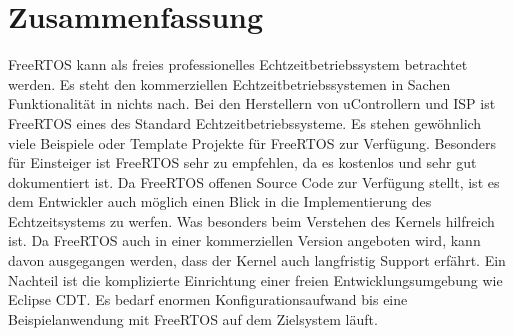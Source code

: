 \pagebreak
\section{Zusammenfassung}
FreeRTOS kann als freies professionelles Echtzeitbetriebssystem betrachtet werden. Es steht den kommerziellen Echtzeitbetriebssystemen in Sachen Funktionalität in nichts nach. Bei den Herstellern von uControllern und ISP ist FreeRTOS eines des Standard Echtzeitbetriebssysteme. Es stehen gewöhnlich viele Beispiele oder Template Projekte für FreeRTOS zur Verfügung.  Besonders für Einsteiger ist FreeRTOS sehr zu empfehlen, da es kostenlos und sehr gut dokumentiert ist. Da FreeRTOS offenen Source Code zur Verfügung stellt, ist es dem Entwickler auch möglich einen Blick in die Implementierung des Echtzeitsystems zu werfen. Was besonders beim Verstehen des Kernels hilfreich ist. Da FreeRTOS auch in einer kommerziellen Version angeboten wird, kann davon ausgegangen werden, dass der Kernel auch langfristig Support erfährt. Ein Nachteil ist die komplizierte Einrichtung einer freien Entwicklungsumgebung wie Eclipse CDT. Es bedarf enormen Konfigurationsaufwand bis eine Beispielanwendung mit FreeRTOS auf dem Zielsystem läuft.     